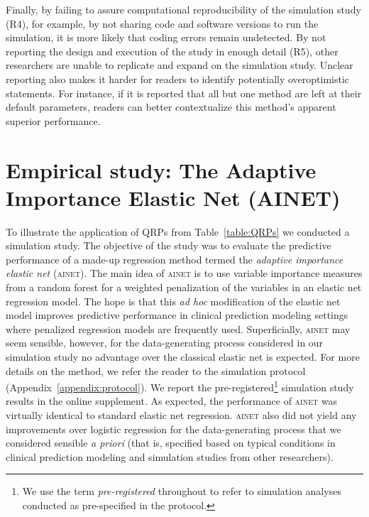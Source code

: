 \documentclass[a4paper, 11pt]{article}
\newcommand{\ainet}{\textsc{ainet}}
\begin{document}
Finally, by failing to assure computational reproducibility of the simulation study (R4),
for example, by not sharing code and software versions to run the simulation,
it is more likely that coding errors remain undetected. By not reporting the design and
execution of the study in enough detail (R5), other researchers are unable to replicate
and expand on the simulation study.
Unclear reporting also makes it harder for readers to identify potentially overoptimistic
statements. For instance, if it is reported that all but one method are left at their
default parameters, readers can better contextualize this method's apparent superior
performance.


\section{Empirical study: The Adaptive Importance Elastic Net
  (AINET)} \label{sec:study}

To illustrate the application of QRPs from Table~\ref{table:QRPs} we conducted a
simulation study. The objective of the study was to evaluate the predictive
performance of a made-up regression method termed the \emph{adaptive importance
  elastic net} (\ainet). The main idea of \ainet{} is to use variable importance
measures from a random forest for a weighted penalization of the variables in an
elastic net regression model. The hope is that this \emph{ad hoc} modification
of the elastic net model improves predictive performance in clinical prediction
modeling settings where penalized regression models are frequently used.
Superficially, \ainet{} may seem sensible, however, for the data-generating
process considered in our simulation study no advantage over the classical
elastic net is expected. For more details on the method, we refer the reader to
the simulation protocol (Appendix~\ref{appendix:protocol}). We report the
pre-registered\footnote{We use the term \emph{pre-registered} throughout to
  refer to simulation analyses conducted as pre-specified in the protocol.}
simulation study results in the online supplement. As expected, the performance
of \ainet{} was virtually identical to standard elastic net regression. \ainet{}
also did not yield any improvements over logistic regression for the
data-generating process that we considered sensible \emph{a priori} (that is,
specified based on typical conditions in clinical prediction modeling and
simulation studies from other researchers).
\end{document}
